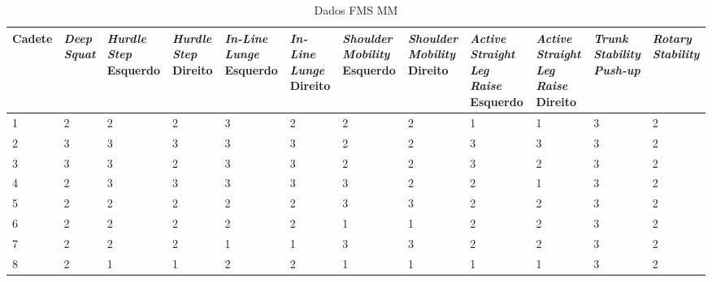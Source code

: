 \begin{landscape}
    
    \begin{table}[h]
        \centering
        \caption{Dados FMS \acrlong{MM}}
        \label{tab:fmsMM}
        \renewcommand{\arraystretch}{1.3}  %
        \begin{adjustbox}{scale=0.9}
        \begin{tabular}{|p{1.8cm}|p{1.6cm}|p{1.6cm}|p{1.6cm}|p{1.6cm}|p{1.6cm}|p{1.6cm}|p{1.6cm}|p{1.6cm}|p{1.6cm}|p{1.6cm}|p{1.6cm}|}
            \hline
            \textbf{Cadete} & \textbf{\textit{Deep Squat}} & \textbf{\textit{Hurdle Step} Esquerdo} & \textbf{\textit{Hurdle Step} Direito} & \textbf{\textit{In-Line Lunge} Esquerdo} & \textbf{\textit{In-Line Lunge} Direito} & \textbf{\textit{Shoulder Mobility} Esquerdo} & \textbf{\textit{Shoulder Mobility} Direito} & \textbf{\textit{Active Straight Leg Raise} Esquerdo} & \textbf{\textit{Active Straight Leg Raise} Direito} & \textbf{\textit{Trunk Stability Push-up}} & \textbf{\textit{Rotary Stability}} \\
            \hline
            1 & 2 & 2 & 2 & 3 & 2 & 2 & 2 & 1 & 1 & 3 & 2 \\
            2 & 3 & 3 & 3 & 3 & 3 & 2 & 2 & 3 & 3 & 3 & 2 \\
            3 & 3 & 3 & 2 & 3 & 3 & 2 & 2 & 3 & 2 & 3 & 2 \\
            4 & 2 & 3 & 3 & 3 & 3 & 3 & 2 & 2 & 1 & 3 & 2 \\
            5 & 2 & 2 & 2 & 2 & 2 & 3 & 3 & 2 & 2 & 3 & 2 \\
            6 & 2 & 2 & 2 & 2 & 2 & 1 & 1 & 2 & 2 & 3 & 2 \\
            7 & 2 & 2 & 2 & 1 & 1 & 3 & 3 & 2 & 2 & 3 & 2 \\
            8 & 2 & 1 & 1 & 2 & 2 & 1 & 1 & 1 & 1 & 3 & 2 \\
            \hline
        \end{tabular}
        \end{adjustbox}
    \end{table}
    

\end{landscape}
